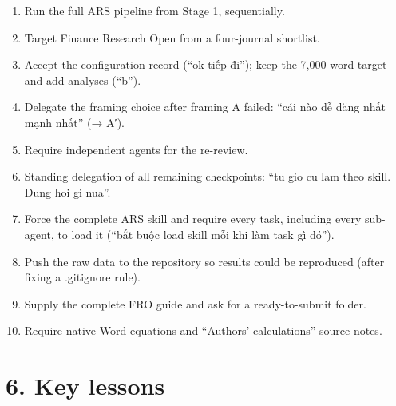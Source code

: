 \documentclass[12pt,a4paper]{article}
\providecommand{\tightlist}{\setlength{\itemsep}{0pt}\setlength{\parskip}{0pt}}
\begin{document}
\begin{enumerate}
\def\labelenumi{\arabic{enumi}.}
\tightlist
\item
  Run the full ARS pipeline from Stage 1, sequentially.
\item
  Target Finance Research Open from a four-journal shortlist.
\item
  Accept the configuration record (``ok tiếp đi''); keep the 7,000-word
  target and add analyses (``b'').
\item
  Delegate the framing choice after framing A failed: ``cái nào dễ đăng
  nhất mạnh nhất'' (→ A′).
\item
  Require independent agents for the re-review.
\item
  Standing delegation of all remaining checkpoints: ``tu gio cu lam theo
  skill. Dung hoi gi nua''.
\item
  Force the complete ARS skill and require every task, including every
  sub-agent, to load it (``bắt buộc load skill mỗi khi làm task gì
  đó'').
\item
  Push the raw data to the repository so results could be reproduced
  (after fixing a .gitignore rule).
\item
  Supply the complete FRO guide and ask for a ready-to-submit folder.
\item
  Require native Word equations and ``Authors' calculations'' source
  notes.
\end{enumerate}

\hypertarget{key-lessons}{%
\section{6. Key lessons}\label{key-lessons}}
\end{document}
